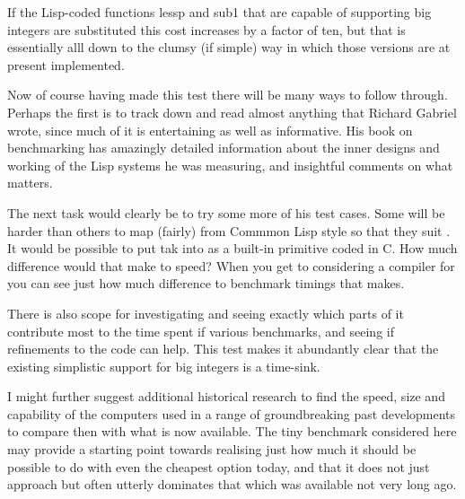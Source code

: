 If the Lisp-coded functions {\tx lessp}
and {\tx sub1} that are capable of supporting big integers are substituted
this cost increases by a factor of ten, but that is essentially alll down
to the clumsy (if simple) way in which those versions are at present
implemented.

Now of course having made this test there will be many ways to follow through.
Perhaps the first is to track down and read almost anything that Richard
Gabriel wrote, since much of it is entertaining as well as informative. His
book on benchmarking has amazingly detailed information about the inner
designs and working of the Lisp systems he was measuring, and insightful
comments on what matters.

The next task would clearly be to try some more of his test cases. Some
will be harder than others to map (fairly) from Commmon Lisp style so
that they suit \vsl. It would be possible to put {\tx tak} into \vsl{} as
a built-in primitive coded in C. How much difference would that make
to speed? When you get to considering a compiler for \vsl{} you can see
just how much difference to benchmark timings that makes.

There is also scope for investigating \vsl{} and seeing exactly which
parts of it contribute most to the time spent if various benchmarks, and
seeing if refinements to the code can help. This test makes it abundantly
clear that the existing simplistic \vsl support for big integers is
a time-sink.

I might further suggest additional historical research to find the
speed, size and capability of the computers used in a range of
groundbreaking past developments to compare then with what is now
available. The tiny benchmark considered here may provide a starting
point towards realising just how much it should be possible to do
with even the cheapest option today, and that it does not just approach
but often utterly dominates that which was available not very long ago.

